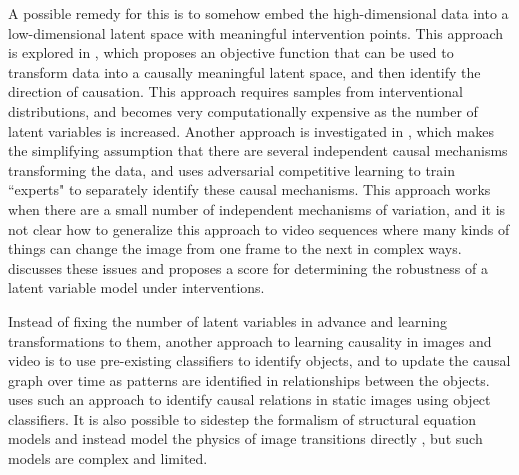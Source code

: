 \documentclass[letterpaper, twocolumn]{article} %
\begin{document}
A possible remedy for this is to somehow embed the high-dimensional data into a low-dimensional latent space with meaningful intervention points. This approach is explored in \cite{bengio2019meta}, which proposes an objective function that can be used to transform data into a causally meaningful latent space, and then identify the direction of causation. This approach requires samples from interventional distributions, and becomes very computationally expensive as the number of latent variables is increased. Another approach is investigated in \cite{parascandolo2017learning}, which makes the simplifying assumption that there are several independent causal mechanisms transforming the data, and uses adversarial competitive learning to train ``experts" to separately identify these causal mechanisms. This approach works when there are a small number of independent mechanisms of variation, and it is not clear how to generalize this approach to video sequences where many kinds of things can change the image from one frame to the next in complex ways. \cite{suter2018interventional} discusses these issues and proposes a score for determining the robustness of a latent variable model under interventions.

Instead of fixing the number of latent variables in advance and learning transformations to them, another approach to learning causality in images and video is to use pre-existing classifiers to identify objects, and to update the causal graph over time as patterns are identified in relationships between the objects. \cite{lopez2017discovering} uses such an approach to identify causal relations in static images using object classifiers. It is also possible to sidestep the formalism of structural equation models and instead model the physics of image transitions directly \cite{brubaker2009estimating} \cite{watter2015embed}, but such models are complex and limited.
\end{document}
